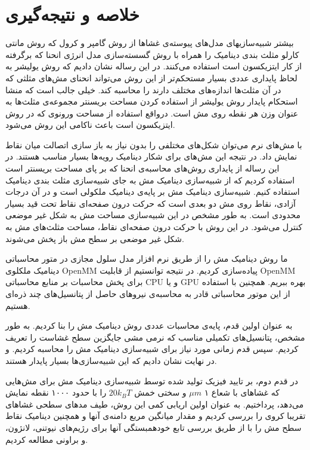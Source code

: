 \section{
خلاصه و نتیجه‌گیری
}
بیشتر شبیه‌سازیهای مدل‌های پیوسته‌ی غشاها از روش گامپر و کرول
\cite{Gompper1996}
که  روش مانتی کارلو مثلث بندی دینامیک 
\cite{Boal1992PRA, Gompper1992Science}
را همراه با روش گسسته‌سازی مدل انرژی انحنا که برگرفته از کار ایتزیکسون
\cite{Itzykson1986}
است استفاده می‌کنند. در این رساله نشان دادیم که روش یولیشر
\cite{Julicher1996}
به لحاظ پایداری عددی بسیار مستحکم‌تر از این روش می‌تواند انحنای مش‌های مثلثی که در آن مثلث‌ها اندازه‌های مختلف دارند را محاسبه کند. خیلی جالب است که منشا استحکام پایدار روش یولیشر از استفاده کردن مساحت بریسنتر مجموعه‌ی مثلث‌ها به عنوان وزن هر نقطه روی مش است. درواقع استفاده از مساحت ورونوی که در روش ایتزیکسون است باعث ناکامی این روش می‌شود.

با مش‌های نرم می‌توان شکل‌های مختلفی را بدون نیاز به باز سازی اتصالت میان نقاط نمایش داد. در نتیجه این مش‌های برای شکار دینامیک رویه‌ها بسیار مناسب هستند. در این رساله از پایداری روش‌های محاسبه‌ی انحنا که بر پای مساحت بریسنتر است استفاده کردیم که از شبیه‌سازی دینامیک مش به جای شبیه‌سازی مثلث بندی دینامیک استفاده کنیم. شبیه‌سازی دینامیک مش بر پایه‌ی دینامیک ملکولی است و در آن درجات آزادی، نقاط روی مش دو بعدی است که حرکت درون صفحه‌ای نقاط تحت قید بسیار محدودی است. به طور مشخص در این شبیه‌سازی مساحت‌ مش به شکل غیر موضعی کنترل می‌شود. در این روش با حرکت درون صفحه‌ای نقاط، مساحت مثلث‌های مش به شکل غیر موضعی بر سطح مش باز پخش می‌شوند. 

ما روش دینامیک مش را از طریق نرم افزار مدل سلول مجازی
\cite{VCMgit}
در متور محاسباتی دینامیک ملکلوی 
OpenMM
\cite{OpenMM2017}
پیاده‌سازی کردیم. در نتیجه توانستیم از قابلیت 
OpenMM 
برای پخش محاسبات بر منابع محاسباتی 
CPU
و یا
GPU
بهره ببریم.  همچنین با استفاده از این موتور محاسباتی قادر به محاسبه‌ی نیروهای حاصل از پتانسیل‌های چند ذره‌ای هستیم.

به عنوان اولین قدم،  پایه‌ی محاسبات عددی روش دینامیک مش را بنا کردیم. به طور مشخص، پتانسیل‌های تکمیلی مناسب که نرمی مشی جایگزین سطح غشاست را تعریف کردیم. سپس قدم زمانی مورد نیاز برای شبیه‌سازی دینامیک مش را محاسبه کردیم. و در نهایت نشان دادیم که این شبیه‌سازی‌ها بسیار پایدار هستند.

در قدم دوم، بر تایید فیزیک تولید شده  توسط شبیه‌سازی دینامیک مش برای مش‌هایی که غشاهای با شعاع ۱
 $\mu m$
و سختی خمش 
 $20 k_BT$
را با حدود ۱۰۰۰ نقطه نمایش می‌دهد، پرداختیم. به عنوان اولین اریابی کمی این روش، طیف مد‌های سطحی غشا‌های تقریبا کروی را بررسی کردیم و مقدار میانگین مربع دامنه‌ی آنها
\cite{milnersafranPRA1987, gomppernelson2012}
و همچنین دینامیک نقاط سطح مش را با از طریق بررسی تابع خودهمبستگی آنها برای رژیم‌های نیوتنی، لانژون، و براونی مطالعه کردیم.

